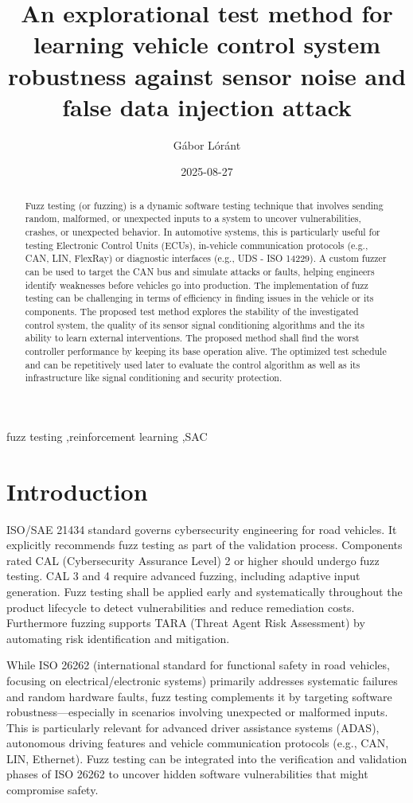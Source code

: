 \documentclass[a4paper, fleqn]{template/cas-dc}
\title[mode=title]{An explorational test method for learning vehicle control system robustness against sensor noise and false data injection attack}
\date{2025-08-27}
\author{Gábor Lóránt}
\begin{document}
	\begin{keywords}
		fuzz testing \sep reinforcement learning \sep SAC
	\end{keywords}
	
	
	\maketitle
	
	\begin{abstract}
		Fuzz testing (or fuzzing) is a dynamic software testing technique that involves sending random, malformed, or unexpected inputs to a system to uncover vulnerabilities, crashes, or unexpected behavior. In automotive systems, this is particularly useful for testing Electronic Control Units (ECUs), in-vehicle communication protocols (e.g., CAN, LIN, FlexRay) or diagnostic interfaces (e.g., UDS - ISO 14229). A custom fuzzer can be used to target the CAN bus and simulate attacks or faults, helping engineers identify weaknesses before vehicles go into production. The implementation of fuzz testing can be challenging in terms of efficiency in finding issues in the vehicle or its components. 
		The proposed test method explores the stability of the investigated control system, the quality of its sensor signal conditioning algorithms and the its ability to learn external interventions. The proposed method shall find the worst controller performance by keeping its base operation alive. The optimized test schedule and can be repetitively used later to evaluate the control algorithm as well as its infrastructure like signal conditioning and security protection.
	\end{abstract}
	
	\section{Introduction}
	ISO/SAE 21434 standard governs cybersecurity engineering for road vehicles. It explicitly recommends fuzz testing as part of the validation process. Components rated CAL (Cybersecurity Assurance Level) 2 or higher should undergo fuzz testing. CAL 3 and 4 require advanced fuzzing, including adaptive input generation. Fuzz testing shall be applied early and systematically throughout the product lifecycle to detect vulnerabilities and reduce remediation costs. Furthermore fuzzing supports TARA (Threat Agent Risk Assessment) by automating risk identification and mitigation.
	
	While ISO 26262 (international standard for functional safety in road vehicles, focusing on electrical/electronic systems) primarily addresses systematic failures and random hardware faults, fuzz testing complements it by targeting software robustness—especially in scenarios involving unexpected or malformed inputs. This is particularly relevant for advanced driver assistance systems (ADAS), autonomous driving features and vehicle communication protocols (e.g., CAN, LIN, Ethernet). Fuzz testing can be integrated into the verification and validation phases of ISO 26262 to uncover hidden software vulnerabilities that might compromise safety.
		
\end{document}
